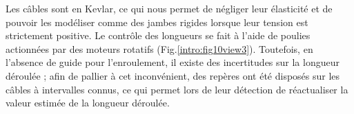 Les câbles sont en Kevlar, ce qui nous permet de négliger leur élasticité et de pouvoir les modéliser comme des jambes rigides lorsque leur tension est strictement positive. Le contrôle des longueurs se fait à l'aide de poulies actionnées par des moteurs rotatifs (Fig.\ref{intro:fig10view3}). Toutefois, en l'absence de guide pour l'enroulement, il existe des incertitudes sur la longueur déroulée ; afin de pallier à cet inconvénient, des repères ont été disposés sur les câbles à intervalles connus, ce qui permet lors de leur détection de réactualiser la valeur estimée de la longueur déroulée.

\begin{figure}[htp]
  \centering
   \\
   \\
   \\

\end{figure}
